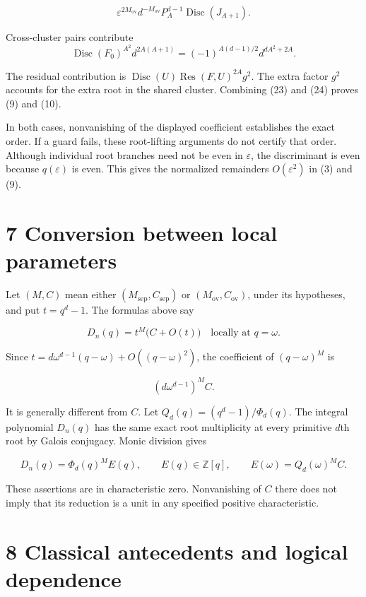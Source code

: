 \documentclass[
  11pt,
]{article}
\begin{document}
\[
\varepsilon^{2M_{\mathrm{ov}}}d^{-M_{\mathrm{ov}}}
P_A^{d-1}\operatorname{Disc}(J_{A+1}). \tag{23}
\]

Cross-cluster pairs contribute
\nopagebreak[4]
\[
\operatorname{Disc}(F_0)^{A^2}d^{2A(A+1)}
=(-1)^{A(d-1)/2}d^{dA^2+2A}. \tag{24}
\]

The residual contribution is
\(\operatorname{Disc}(U)\operatorname{Res}(F,U)^{2A}g^2\). The extra
factor \(g^2\) accounts for the extra root in the shared cluster.
Combining (23) and (24) proves (9) and (10).

In both cases, nonvanishing of the displayed coefficient establishes the
exact order. If a guard fails, these root-lifting arguments do not
certify that order. Although individual root branches need not be even
in \(\varepsilon\), the discriminant is even because \(q(\varepsilon)\)
is even. This gives the normalized remainders \(O(\varepsilon^2)\) in
(3) and (9).

\section{7 Conversion between local
parameters}\label{conversion-between-local-parameters}

Let \((M,C)\) mean either \((M_{\mathrm{sep}},C_{\mathrm{sep}})\) or
\((M_{\mathrm{ov}},C_{\mathrm{ov}})\), under its hypotheses, and put
\(t=q^d-1\). The formulas above say

\[
D_n(q)=t^M\bigl(C+O(t)\bigr)\quad\text{locally at }q=\omega. \tag{25}
\]

Since \(t=d\omega^{d-1}(q-\omega)+O((q-\omega)^2)\), the coefficient of
\((q-\omega)^M\) is

\[
(d\omega^{d-1})^M C. \tag{26}
\]

It is generally different from \(C\). Let \(Q_d(q)=(q^d-1)/\Phi_d(q)\).
The integral polynomial \(D_n(q)\) has the same exact root multiplicity
at every primitive \(d\)th root by Galois conjugacy. Monic division
gives

\[
D_n(q)=\Phi_d(q)^M E(q),\qquad E(q)\in\mathbb Z[q],
\qquad E(\omega)=Q_d(\omega)^M C. \tag{27}
\]

These assertions are in characteristic zero. Nonvanishing of \(C\) there
does not imply that its reduction is a unit in any specified positive
characteristic.

\section{8 Classical antecedents and logical
dependence}\label{classical-antecedents-and-logical-dependence}
\end{document}
